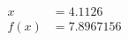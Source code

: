\documentclass[preview]{standalone}
\begin{document}
\begin{align*}
x &= 4.1126\\f(x) &= 7.8967156
\end{align*}
\end{document}
